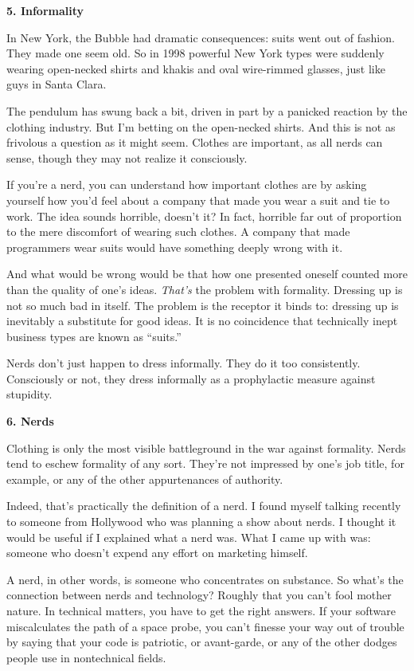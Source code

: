 \textbf{5. Informality}

In New York, the Bubble had dramatic consequences: suits went out of
fashion. They made one seem old. So in 1998 powerful New York types were
suddenly wearing open-necked shirts and khakis and oval wire-rimmed
glasses, just like guys in Santa Clara.

The pendulum has swung back a bit, driven in part by a panicked reaction
by the clothing industry. But I'm betting on the open-necked shirts. And
this is not as frivolous a question as it might seem. Clothes are
important, as all nerds can sense, though they may not realize it
consciously.

If you're a nerd, you can understand how important clothes are by asking
yourself how you'd feel about a company that made you wear a suit and
tie to work. The idea sounds horrible, doesn't it? In fact, horrible far
out of proportion to the mere discomfort of wearing such clothes. A
company that made programmers wear suits would have something deeply
wrong with it.

And what would be wrong would be that how one presented oneself counted
more than the quality of one's ideas. \emph{That's} the problem with
formality. Dressing up is not so much bad in itself. The problem is the
receptor it binds to: dressing up is inevitably a substitute for good
ideas. It is no coincidence that technically inept business types are
known as ``suits.''

Nerds don't just happen to dress informally. They do it too
consistently. Consciously or not, they dress informally as a
prophylactic measure against stupidity.

\textbf{6. Nerds}

Clothing is only the most visible battleground in the war against
formality. Nerds tend to eschew formality of any sort. They're not
impressed by one's job title, for example, or any of the other
appurtenances of authority.

Indeed, that's practically the definition of a nerd. I found myself
talking recently to someone from Hollywood who was planning a show about
nerds. I thought it would be useful if I explained what a nerd was. What
I came up with was: someone who doesn't expend any effort on marketing
himself.

A nerd, in other words, is someone who concentrates on substance. So
what's the connection between nerds and technology? Roughly that you
can't fool mother nature. In technical matters, you have to get the
right answers. If your software miscalculates the path of a space probe,
you can't finesse your way out of trouble by saying that your code is
patriotic, or avant-garde, or any of the other dodges people use in
nontechnical fields.

